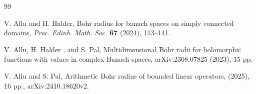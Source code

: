 \documentclass[a4paper,11pt, reqno]{amsart}
\theoremstyle{definition}
\begin{document}
\begin{thebibliography}{99}
	
	
	
	
	
	 {\sc V. Allu } and {\sc H. Halder}, Bohr radius for banach spaces on simply connected domains, {\it Proc. Edinb. Math. Soc.} {\bf 67} (2024), 113--141.
	
	 {\sc V. Allu, H. Halder }, and {\sc S. Pal}, Multidimensional Bohr radii for holomorphic functions with values in complex Banach spaces, arXiv:2308.07825 (2023), 15 pp.
	
	
	 {\sc V. Allu} and {\sc S. Pal}, Arithmetic Bohr radius of bounded linear operators, (2025), 16 pp., arXiv:2410.18620v2.  
	
	
	
	
	
	

\end{thebibliography}
\end{document}
